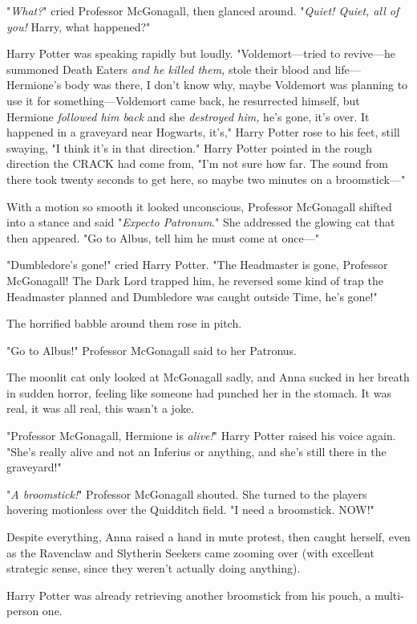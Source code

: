 "\emph{What?}" cried Professor McGonagall, then glanced around. "\emph{Quiet!
Quiet, all of you!} Harry, what happened?"

Harry Potter was speaking rapidly but loudly. "Voldemort---tried to revive---he
summoned Death Eaters \emph{and he killed them,} stole their blood and
life---Hermione's body was there, I don't know why, maybe Voldemort was
planning to use it for something---Voldemort came back, he resurrected himself,
but Hermione \emph{followed him back} and she \emph{destroyed him,} he's gone,
it's over. It happened in a graveyard near Hogwarts, it's," Harry Potter rose
to his feet, still swaying, "I think it's in that direction." Harry Potter
pointed in the rough direction the CRACK had come from, "I'm not sure how far.
The sound from there took twenty seconds to get here, so maybe two minutes on a
broomstick---"

With a motion so smooth it looked unconscious, Professor McGonagall shifted
into a stance and said "\emph{Expecto Patronum}." She addressed the
glowing cat that then appeared. "Go to Albus, tell him he must come at once---"

"Dumbledore's gone!" cried Harry Potter. "The Headmaster is gone, Professor
McGonagall! The Dark Lord trapped him, he reversed some kind of trap the
Headmaster planned and Dumbledore was caught outside Time, he's gone!"

The horrified babble around them rose in pitch.

"Go to Albus!" Professor McGonagall said to her Patronus.

The moonlit cat only looked at McGonagall sadly, and Anna sucked in her breath
in sudden horror, feeling like someone had punched her in the stomach. It was
real, it was all real, this wasn't a joke.

"Professor McGonagall, Hermione is \emph{alive!}" Harry Potter raised his voice
again. "She's really alive and not an Inferius or anything, and she's still
there in the graveyard!"

"\emph{A broomstick!}" Professor McGonagall shouted. She turned to the players
hovering motionless over the Quidditch field. "I need a broomstick. NOW!"

Despite everything, Anna raised a hand in mute protest, then caught herself,
even as the Ravenclaw and Slytherin Seekers came zooming over (with excellent
strategic sense, since they weren't actually doing anything).

Harry Potter was already retrieving another broomstick from his pouch, a
multi-person one.

